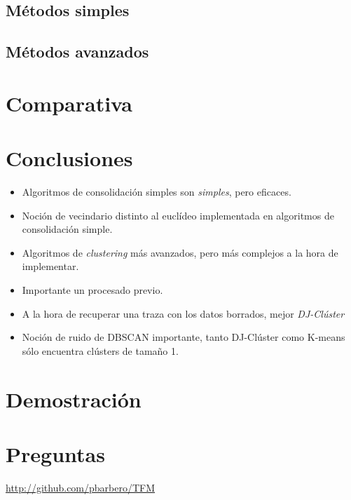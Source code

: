 \documentclass[10pt, spanish]{beamer}
\begin{document}
\subsection{M\'etodos simples}
\begin{frame}

\end{frame}

\subsection{M\'etodos avanzados}
\begin{frame}

\end{frame}


\section{Comparativa}
\begin{frame}

\end{frame}

\section{Conclusiones}
\begin{frame}
\begin{itemize}[<+- | alert@+>]
	\item Algoritmos de consolidaci\'on simples son \textit{simples}, pero eficaces.
	\item Noci\'on de vecindario distinto al eucl\'ideo implementada en algoritmos de consolidaci\'on simple.
	\item Algoritmos de \textit{clustering} m\'as avanzados, pero m\'as complejos a la hora de implementar.
	\item Importante un procesado previo.
	\item A la hora de recuperar una traza con los datos borrados, mejor \textit{DJ-Cl\'uster}
	\item Noci\'on de ruido de DBSCAN importante, tanto DJ-Cl\'uster como K-means s\'olo encuentra cl\'usters de tama\~no 1.
\end{itemize}
\end{frame}

\section{Demostraci\'on}
\begin{frame}

\end{frame}

\section{Preguntas}

\begin{frame}
	\begin{center}
		\href{http://github.com/pbarbero/TFM}{http://github.com/pbarbero/TFM}
	\end{center}
\end{frame}
\end{document}
